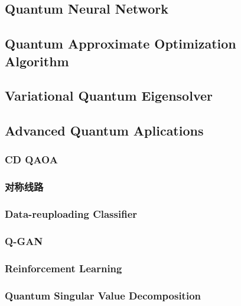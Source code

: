\documentclass[pra,twocolumn,superscriptaddress,floatfix,nofootinbib,amsmath,amssymb]{revtex4-1}
\begin{document}
\subsection{Quantum Neural Network}


\subsection{Quantum Approximate Optimization Algorithm}


\subsection{Variational Quantum Eigensolver}


\subsection{Advanced Quantum Aplications}


\subsubsection{CD QAOA}


\subsubsection{对称线路}


\subsubsection{Data-reuploading Classifier}


\subsubsection{Q-GAN}


\subsubsection{Reinforcement Learning}


\subsubsection{Quantum Singular Value Decomposition}

\end{document}
